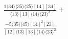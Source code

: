 \documentclass[varwidth, border=5pt]{standalone}
\begin{document}
\begin{my}
$\begin{gathered}
\scriptscriptstyle\frac{1⟨34⟩⟨35⟩⟨25⟩[14][34]}{⟨13⟩[13]⟨14⟩⟨23⟩^3}+\\
\scriptscriptstyle\frac{-5⟨35⟩⟨45⟩[14]^2[23]}{[12]⟨13⟩[13]⟨14⟩⟨23⟩^2}\phantom{+}
\end{gathered}$
\end{my}
\end{document}
